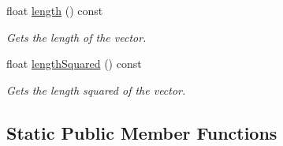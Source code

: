 \begin{DoxyCompactItemize}
float \hyperlink{classflounder_1_1vector4_ac0615801260a6a2b35eb5812c4834ac9}{length} () const
\begin{DoxyCompactList}\small\item\em Gets the length of the vector. \end{DoxyCompactList}\item 
float \hyperlink{classflounder_1_1vector4_a872050dbf8c90f8cf7f42d14d6dbe793}{length\+Squared} () const
\begin{DoxyCompactList}\small\item\em Gets the length squared of the vector. \end{DoxyCompactList}\end{DoxyCompactItemize}
\subsection*{Static Public Member Functions}
